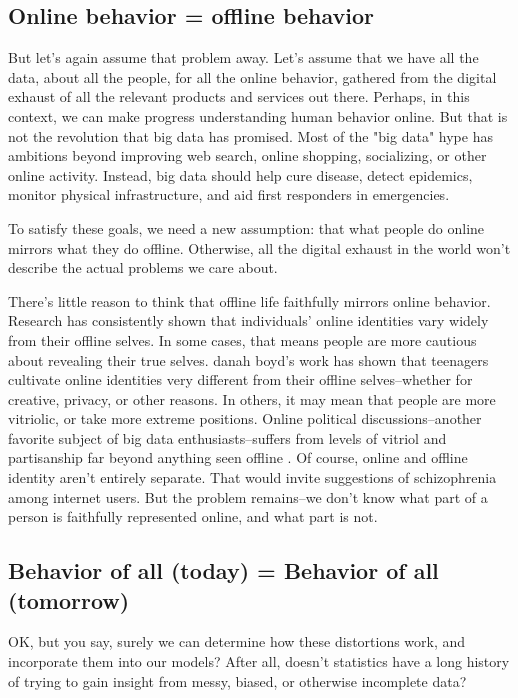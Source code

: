 \documentclass[12pt]{article}
\begin{document}
\subsection{Online behavior = offline behavior}
\label{sec:online-offline}

But let's again assume that problem away. Let's assume that we have
all the data, about all the people, for all the online behavior,
gathered from the digital exhaust of all the relevant products and
services out there. Perhaps, in this context, we can make progress
understanding human behavior online. But that is not the revolution
that big data has promised. Most of the "big data" hype has ambitions
beyond improving web search, online shopping, socializing, or other
online activity. Instead, big data should help cure disease, detect
epidemics, monitor physical infrastructure, and aid first responders
in emergencies. 

To satisfy these goals, we need a new assumption: that what
people do online mirrors what they do offline. Otherwise, all the
digital exhaust in the world won't describe the actual problems we
care about. 

There's little reason to think that offline life faithfully mirrors
online behavior. Research has consistently shown that individuals'
online identities vary widely from their offline selves. In some
cases, that means people are more cautious about revealing their true
selves. danah boyd's work \citep{boyd2011social} has shown that
teenagers cultivate online identities very different from their
offline selves--whether for creative, privacy, or other reasons. In
others, it may mean that people are more vitriolic, or take more
extreme positions. Online political discussions--another favorite
subject of big data enthusiasts--suffers from levels of vitriol and partisanship far beyond
anything seen offline \citep{conover2011}. Of course, online and
offline identity aren't entirely separate. That would invite
suggestions of schizophrenia among internet users. But the problem
remains--we don't know what part of a person is faithfully represented
online, and what part is not.

\subsection{Behavior of all (today) = Behavior of all (tomorrow)}
\label{sec:behave-today-tomorrow}

OK, but you say, surely we can determine how these distortions work,
and incorporate them into our models? After all, doesn't statistics
have a long history of trying to gain insight from messy, biased, or
otherwise incomplete data?
\end{document}
